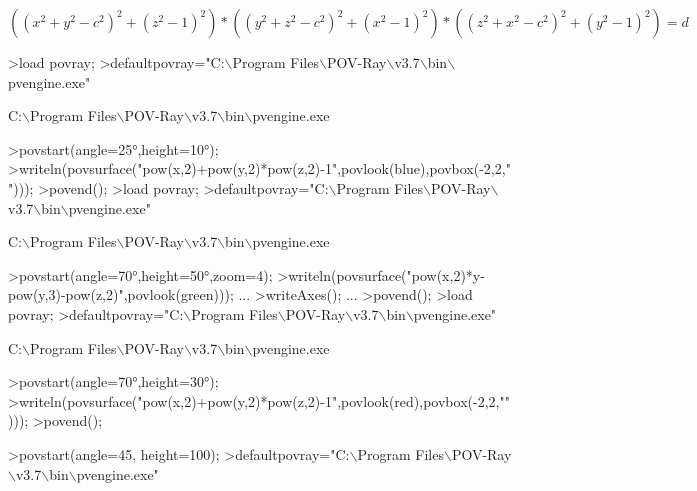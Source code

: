 \documentclass[a4paper,10pt]{article}
\begin{document}
\begin{eulernotebook}
\begin{eulercomment}
\begin{eulercomment}
\begin{eulercomment}
\begin{eulercomment}
\begin{eulercomment}
\begin{eulercomment}
\begin{eulercomment}
\begin{eulercomment}
\begin{eulercomment}
\begin{eulercomment}
\begin{eulercomment}
\begin{eulercomment}
\begin{eulercomment}
\end{eulercomment}
\begin{eulerformula}
\[
((x^2+y^2-c^2)^2+(z^2-1)^2)*((y^2+z^2-c^2)^2+(x^2-1)^2)*((z^2+x^2-c^2)^2+(y^2-1)^2)=d
\]
\end{eulerformula}
\begin{eulerprompt}
>load povray;
>defaultpovray="C:\(\backslash\)Program Files\(\backslash\)POV-Ray\(\backslash\)v3.7\(\backslash\)bin\(\backslash\)pvengine.exe"
\end{eulerprompt}
\begin{euleroutput}
  C:\(\backslash\)Program Files\(\backslash\)POV-Ray\(\backslash\)v3.7\(\backslash\)bin\(\backslash\)pvengine.exe
\end{euleroutput}
\begin{eulerprompt}
>povstart(angle=25°,height=10°);
>writeln(povsurface("pow(x,2)+pow(y,2)*pow(z,2)-1",povlook(blue),povbox(-2,2,"")));
>povend();
>load povray;
>defaultpovray="C:\(\backslash\)Program Files\(\backslash\)POV-Ray\(\backslash\)v3.7\(\backslash\)bin\(\backslash\)pvengine.exe"
\end{eulerprompt}
\begin{euleroutput}
  C:\(\backslash\)Program Files\(\backslash\)POV-Ray\(\backslash\)v3.7\(\backslash\)bin\(\backslash\)pvengine.exe
\end{euleroutput}
\begin{eulerprompt}
>povstart(angle=70°,height=50°,zoom=4);
>writeln(povsurface("pow(x,2)*y-pow(y,3)-pow(z,2)",povlook(green))); ...
>writeAxes(); ...
>povend();
>load povray;
>defaultpovray="C:\(\backslash\)Program Files\(\backslash\)POV-Ray\(\backslash\)v3.7\(\backslash\)bin\(\backslash\)pvengine.exe"
\end{eulerprompt}
\begin{euleroutput}
  C:\(\backslash\)Program Files\(\backslash\)POV-Ray\(\backslash\)v3.7\(\backslash\)bin\(\backslash\)pvengine.exe
\end{euleroutput}
\begin{eulerprompt}
>povstart(angle=70°,height=30°);
>writeln(povsurface("pow(x,2)+pow(y,2)*pow(z,2)-1",povlook(red),povbox(-2,2,"")));
>povend();
\end{eulerprompt}
\begin{eulerprompt}
>povstart(angle=45, height=100);
>defaultpovray="C:\(\backslash\)Program Files\(\backslash\)POV-Ray\(\backslash\)v3.7\(\backslash\)bin\(\backslash\)pvengine.exe"
\end{eulerprompt}
\begin{euleroutput}

\end{euleroutput}
\end{eulercomment}
\end{eulercomment}
\end{eulercomment}
\end{eulercomment}
\end{eulercomment}
\end{eulercomment}
\end{eulercomment}
\end{eulercomment}
\end{eulercomment}
\end{eulercomment}
\end{eulercomment}
\end{eulercomment}
\end{eulernotebook}
\end{document}
